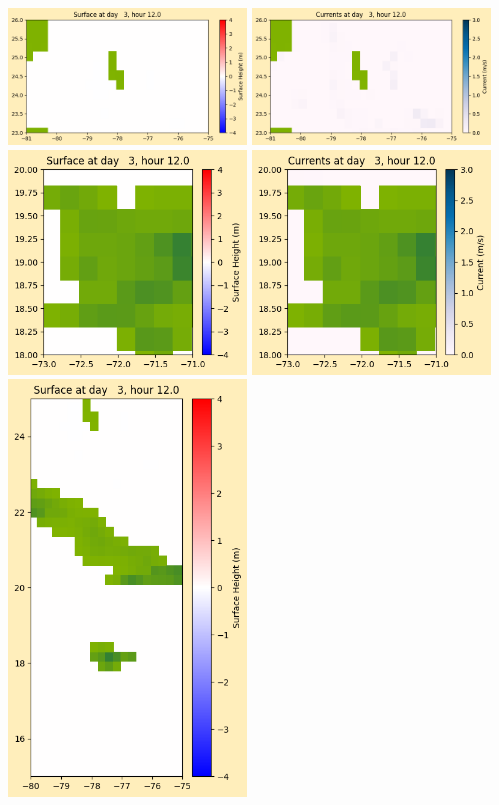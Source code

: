 \documentclass[11pt]{article}
\begin{document}
\vskip 10pt 
\includegraphics[width=0.475\textwidth]{frame0026fig1003.png}
\includegraphics[width=0.475\textwidth]{frame0026fig1004.png}
\vskip 10pt 
\includegraphics[width=0.475\textwidth]{frame0026fig1005.png}
\includegraphics[width=0.475\textwidth]{frame0026fig1006.png}
\vskip 10pt 
\includegraphics[width=0.475\textwidth]{frame0026fig1007.png}
\end{document}
